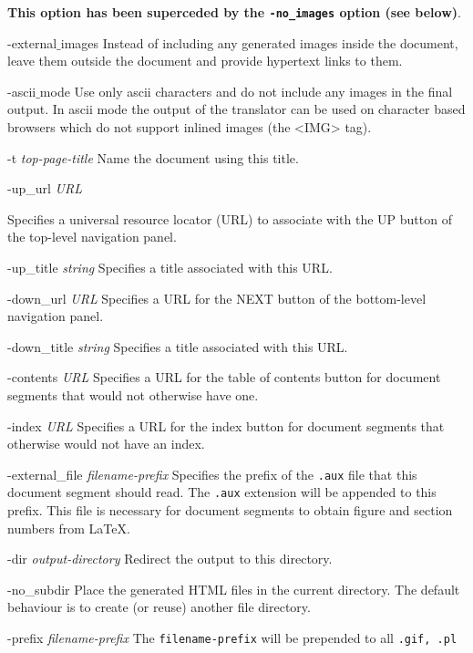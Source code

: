 \documentclass[dvips]{article}
\newcommand{\HTML}[1]{{\ttfamily <#1>}}%
\begin{document}
\begin{htmllist}
\textbf{This option has been superceded by the \texttt{-no\_images} option
(see below)}.
\item [-external$\_$images]
Instead of including any generated images inside the document, leave them
outside the document and provide hypertext links to them.
\label{asciimode} 
\item [-ascii$\_$mode]
Use only ascii characters and do not include any images in the final output.
In ascii mode the output of the translator can be used on
character based browsers which do not support inlined images (the \HTML{IMG} tag).
\item [-t \textsl{top-page-title}]
Name the document using this title.
\item [-up\_url \textsl{URL}] 
\begin{changebar}
Specifies a universal resource locator (URL) to associate
with the UP button of the top-level navigation panel.
\item [-up\_title \textsl{string}] Specifies a title associated with this URL.
\item [-down\_url \textsl{URL}]
Specifies a URL for the NEXT button of the bottom-level navigation panel.
\item [-down\_title \textsl{string}] Specifies a title associated with this URL.
\item [-contents \textsl{URL}] Specifies a URL for the table of contents button
for document segments that would not otherwise have one.
\item [-index \textsl{URL}] Specifies a URL for the index button for document segments
that otherwise would not have an index.
\item [-external\_file \textsl{filename-prefix}]  Specifies the prefix of the
\texttt{.aux} file that this document segment should read.  The 
\texttt{.aux} extension will be appended to this prefix.  This file
is necessary for document segments to obtain figure and section
numbers from \LaTeX.
\end{changebar}
\item [-dir \textsl{output-directory}]
Redirect the output to this directory. 
\item [-no\_subdir]
Place the generated HTML files  in the 
current directory. The default behaviour is to create (or reuse)
another file directory.
\begin{changebar}
\label{prefix}
\item [-prefix \textsl{filename-prefix}]
  The \texttt{filename-prefix}
  will be prepended to all \texttt{.gif, .pl}

\end{changebar}
\end{htmllist}
\end{document}
